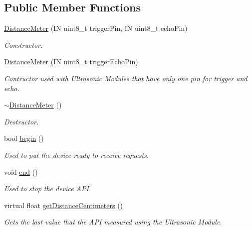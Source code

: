 \subsection*{Public Member Functions}
\begin{DoxyCompactItemize}
\item 
\hyperlink{class_easyuino_1_1_distance_meter_aad61ebf8398ba5cf6a80e5defc29bfcc}{Distance\+Meter} (IN uint8\+\_\+t trigger\+Pin, IN uint8\+\_\+t echo\+Pin)
\begin{DoxyCompactList}\small\item\em Constructor. \end{DoxyCompactList}\item 
\hyperlink{class_easyuino_1_1_distance_meter_aa5551cc3c42fe77f0972a41acf896cf9}{Distance\+Meter} (IN uint8\+\_\+t trigger\+Echo\+Pin)
\begin{DoxyCompactList}\small\item\em Contructor used with Ultrasonic Modules that have only one pin for trigger and echo. \end{DoxyCompactList}\item 
\mbox{\label{class_easyuino_1_1_distance_meter_aacd298add519e79000e08a7bb1995d0f}} 
\hyperlink{class_easyuino_1_1_distance_meter_aacd298add519e79000e08a7bb1995d0f}{$\sim$\+Distance\+Meter} ()
\begin{DoxyCompactList}\small\item\em Destructor. \end{DoxyCompactList}\item 
bool \hyperlink{class_easyuino_1_1_distance_meter_a0374e6f806cd71f0f918c6ea7b7700a0}{begin} ()
\begin{DoxyCompactList}\small\item\em Used to put the device ready to receive requests. \end{DoxyCompactList}\item 
void \hyperlink{class_easyuino_1_1_distance_meter_a8a818cc922418ae5a078193dbfab1e6b}{end} ()
\begin{DoxyCompactList}\small\item\em Used to stop the device A\+PI. \end{DoxyCompactList}\item 
virtual float \hyperlink{class_easyuino_1_1_distance_meter_a637cdd0d3e4f3bcf094704ae91e0c7c3}{get\+Distance\+Centimeters} ()
\begin{DoxyCompactList}\small\item\em Gets the last value that the A\+PI measured using the Ultrasonic Module. \end{DoxyCompactList}\item 

\end{DoxyCompactItemize}
